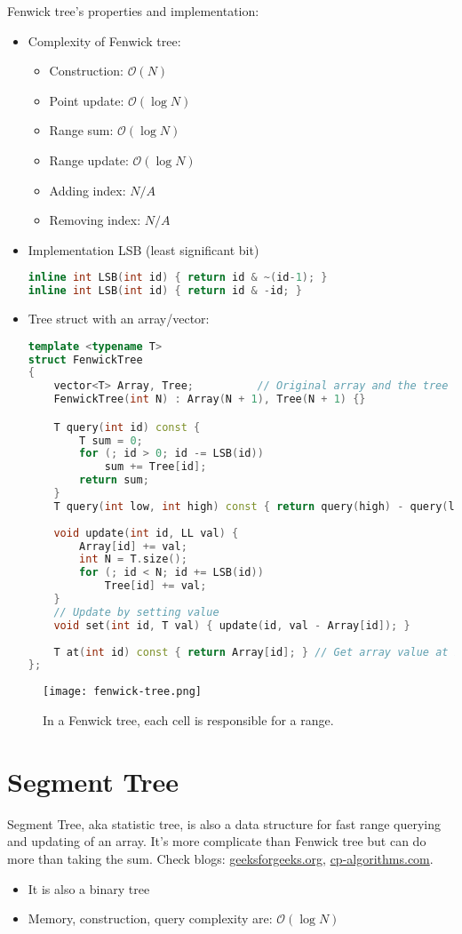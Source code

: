 Fenwick tree's properties and implementation:
\begin{itemize}
	\item Complexity of Fenwick tree:
	\begin{itemize}
		\item Construction: $ \mathcal{O}(N) $
		\item Point update: $ \mathcal{O}(\log N) $
		\item Range sum: $ \mathcal{O}(\log N) $
		\item Range update: $ \mathcal{O}(\log N) $
		\item Adding index: $ N/A $
		\item Removing index: $ N/A $
	\end{itemize}
	\item Implementation LSB (least significant bit)
\begin{lstlisting}[language=C++]
inline int LSB(int id) { return id & ~(id-1); }
inline int LSB(int id) { return id & -id; }
\end{lstlisting}
	\item Tree struct with an array/vector:
\begin{lstlisting}[language=C++]
template <typename T>
struct FenwickTree
{
	vector<T> Array, Tree;          // Original array and the tree
	FenwickTree(int N) : Array(N + 1), Tree(N + 1) {}

	T query(int id) const {
		T sum = 0;
		for (; id > 0; id -= LSB(id))
			sum += Tree[id];
		return sum;
	}
	T query(int low, int high) const { return query(high) - query(low - 1); }
	
	void update(int id, LL val)	{
		Array[id] += val;
		int N = T.size();
		for (; id < N; id += LSB(id))
			Tree[id] += val;
	}
	// Update by setting value
	void set(int id, T val) { update(id, val - Array[id]); }
	
	T at(int id) const { return Array[id]; } // Get array value at id
};
\end{lstlisting}
\end{itemize}

\begin{figure}[hbt!]
	\centering
	\texttt{[image: fenwick-tree.png]}
	\caption{In a Fenwick tree, each cell is responsible for a range.}
\end{figure}

\section{Segment Tree}
Segment Tree, \ac{aka} statistic tree, is also a data structure for fast range querying and updating of an array. It's more complicate than Fenwick tree but can do more than taking the sum. Check blogs: \href{https://www.geeksforgeeks.org/segment-tree-set-1-sum-of-given-range/}{geeksforgeeks.org}, \href{https://cp-algorithms.com/data_structures/segment_tree.html}{cp-algorithms.com}.
\begin{itemize}
	\item It is also a binary tree
	\item Memory, construction, query complexity are: $ \mathcal{O}(\log N) $
\end{itemize}

